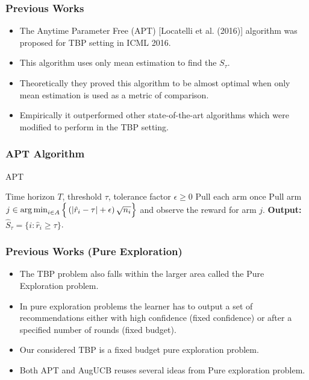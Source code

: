 \begin{frame}
\frametitle{Previous Works}
\begin{itemize}
\item<1-> The Anytime Parameter Free (APT) [{Locatelli et al. (2016)}] algorithm was proposed for TBP setting in ICML 2016. 
\item<2-> This algorithm uses only mean estimation to find the $S_{\tau}$. 
\item<3-> Theoretically they proved this algorithm to be almost optimal when only mean estimation is used as a metric of comparison.
\item<4-> Empirically it outperformed other state-of-the-art algorithms which were modified to perform in the TBP setting.  
\end{itemize}
\end{frame}

\begin{frame}
\frametitle{APT Algorithm}
\begin{algorithm}[H]
\caption{APT}
\begin{algorithmic}[1]
 Time horizon $T$, threshold $\tau$, tolerance factor $\epsilon\geq 0$
\State Pull each arm once
\vspace{-3mm}
\State {}
\State Pull arm $j\in\operatorname*{arg\,min}_{i\in A}\Big\lbrace \left(|\hat{r}_{i} - \tau | + \epsilon\right)\sqrt{n_i}\Big\rbrace$ and observe the reward for arm $j$.
\EndFor
\State \textbf{Output:} $\hat{S}_{\tau}=\lbrace i: \hat{r}_{i}\geq \tau \rbrace$.
\end{algorithmic}
\end{algorithm}
\end{frame}

\begin{frame}
\frametitle{Previous Works (Pure Exploration)}
\begin{itemize}
\item<1-> The TBP problem also falls within the larger area called the Pure Exploration problem.
\item<2-> In pure exploration problems the learner has to output a set of recommendations either with high confidence (fixed confidence) or after a specified number of rounds (fixed budget).
\item<3-> Our considered TBP is a fixed budget pure exploration problem.
\item<4-> Both APT and AugUCB reuses several ideas from Pure exploration problem. 
\end{itemize}
\end{frame}

